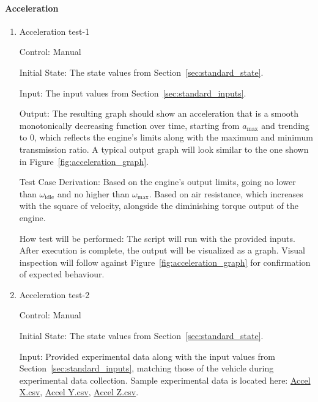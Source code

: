 \documentclass[12pt, titlepage]{article}
\begin{document}
\paragraph{Acceleration}

\begin{enumerate}

  \item{Acceleration test-1\\}
  
  Control: Manual
            
  Initial State: The state values from Section~\ref{sec:standard_state}.
  
  Input: The input values from Section~\ref{sec:standard_inputs}.
            
  Output: The resulting graph should show an acceleration that is a smooth monotonically decreasing function over time, starting from $a_\text{max}$ and trending to 0, which reflects the engine's limits along with the maximum and minimum transmission ratio. A typical output graph will look similar to the one shown in Figure~\ref{fig:acceleration_graph}.
  
  Test Case Derivation: Based on the engine's output limits, going no lower than $\omega_\text{idle}$ and no higher than $\omega_\text{max}$.
  Based on air resistance, which increases with the square of velocity, alongside the diminishing torque output of the engine.
  
  How test will be performed: The script will run with the provided inputs. After execution is complete, the output will be visualized as a graph. Visual inspection will follow against Figure~\ref{fig:acceleration_graph} for confirmation of expected behaviour.

  \item{Acceleration test-2\\}

  Control: Manual

  Initial State: The state values from Section~\ref{sec:standard_state}.

  Input: Provided experimental data along with the input values from Section~\ref{sec:standard_inputs}, matching those of the vehicle during experimental data collection. Sample experimental data is located here: \href{https://github.com/gr812b/CVT-Simulator/experimental-data/IMU%20ACCEL%20X.csv}{Accel X.csv}, \href{https://github.com/gr812b/CVT-Simulator/experimental-data/IMU%20ACCEL%20Y.csv}{Accel Y.csv}, \href{https://github.com/gr812b/CVT-Simulator/experimental-data/IMU%20ACCEL%20Z.csv}{Accel Z.csv}.


\end{enumerate}
\end{document}
